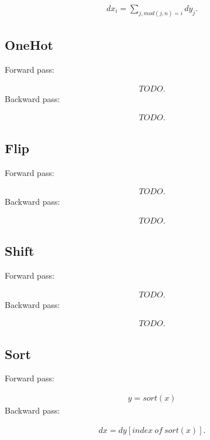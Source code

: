 \documentclass{article}
\begin{document}
\begin{eqnarray}
  dx_i = \sum_{j, mod(j, n) = i} dy_j.
\end{eqnarray}


\subsection{OneHot}

Forward pass:

\begin{eqnarray}
  TODO.  
\end{eqnarray}
%
Backward pass:

\begin{eqnarray}
  TODO.  
\end{eqnarray}


\subsection{Flip}

Forward pass:

\begin{eqnarray}
  TODO.  
\end{eqnarray}
%
Backward pass:

\begin{eqnarray}
  TODO.  
\end{eqnarray}


\subsection{Shift}

Forward pass:

\begin{eqnarray}
  TODO.  
\end{eqnarray}
%
Backward pass:

\begin{eqnarray}
  TODO.  
\end{eqnarray}


\subsection{Sort}

Forward pass:

\begin{eqnarray}
  y = sort(x)
\end{eqnarray}
%
Backward pass:

\begin{eqnarray}
  dx = dy[index\ of\ sort(x)].
\end{eqnarray}
\end{document}
